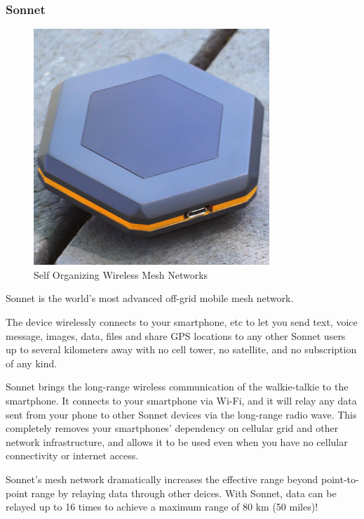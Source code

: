 			\subsubsection{Sonnet}
		
				\noindent
				\begin{minipage}{0.48\textwidth}%
					\begin{figure}[H]
						\centering
						\includegraphics[width=\textwidth]{resources/img/chap4/sonnet}
						\caption[Self Organizing Wireless Mesh Networks]{Self Organizing Wireless Mesh Networks\cite{BADIS2015653}}
						\label{img:wms_microsoft}
					\end{figure}
				\end{minipage}%
				\hfill%
				\begin{minipage}{0.5\textwidth}\raggedright

Sonnet is the world's most advanced off-grid mobile mesh network.

The device wirelessly connects to your smartphone, etc to let you send text, voice message, images, data, files and share GPS locations to any other Sonnet users up to several kilometers away with no cell tower, no satellite, and no subscription of any kind.

Sonnet brings the long-range wireless communication of the walkie-talkie to the smartphone. It connects to your smartphone via Wi-Fi, and it will relay any data sent from your phone to other Sonnet devices via the long-range radio wave. This completely removes your smartphones’ dependency on cellular grid and other network infrastructure, and allows it to be used even when you have no cellular connectivity or internet access.

Sonnet's mesh network dramatically increases the effective range beyond point-to-point range by relaying data through other deices. With Sonnet, data can be relayed up to 16 times to achieve a maximum range of 80 km (50 miles)!
				\end{minipage}

